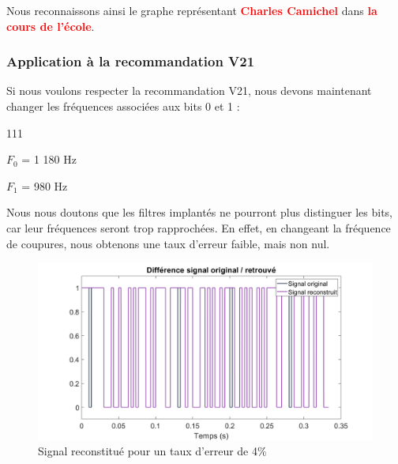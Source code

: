 Nous reconnaissons ainsi le graphe représentant \textbf{\textcolor{Red}{Charles Camichel}} dans \textbf{\textcolor{Red}{la cours de l'école}}.

\subsubsection{Application à la recommandation V21}
Si nous voulons respecter la recommandation V21, nous devons maintenant changer les fréquences associées aux bits 0 et 1 :
\begin{dinglist}{111}
   \item $F_0$ = 1 180 Hz
   \item $F_1$ = 980 Hz
\end{dinglist}

Nous nous doutons que les filtres implantés ne pourront plus distinguer les bits, car leur fréquences seront trop rapprochées.
En effet, en changeant la fréquence de coupures, nous obtenons une taux d'erreur faible, mais non nul.
\begin{figure}[H]
   \centering
   \includegraphics[scale=0.4]{partie-2/sous-partie-3/2.3.3.12.png}
   \caption{Signal reconstitué pour un taux d'erreur de 4\%} \label{fig:image-reconstituee}
\end{figure}